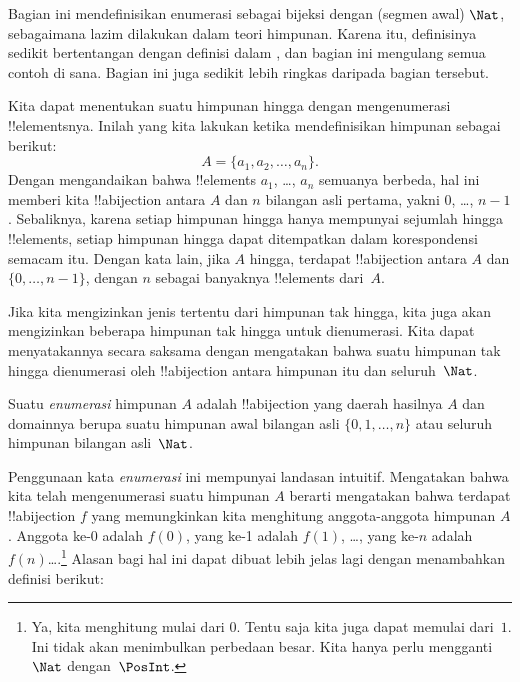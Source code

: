 \documentclass[../../../include/open-logic-section]{subfiles}
\begin{document}


\begin{editorial}
  Bagian ini mendefinisikan enumerasi sebagai bijeksi dengan (segmen awal)
  $\Nat$, sebagaimana lazim dilakukan dalam teori himpunan. Karena itu,
  definisinya sedikit bertentangan dengan definisi dalam , dan
  bagian ini mengulang semua contoh di sana. Bagian ini juga sedikit lebih
  ringkas daripada bagian tersebut.
\end{editorial}

Kita dapat menentukan suatu himpunan hingga dengan mengenumerasi
!!{element}snya. Inilah yang kita lakukan ketika mendefinisikan himpunan
sebagai berikut:
\[
  A = \{a_1, a_2, \ldots, a_n\}.
\]
Dengan mengandaikan bahwa !!{element}s $a_1$, \dots, $a_n$ semuanya berbeda,
hal ini memberi kita !!a{bijection} antara $A$ dan $n$ bilangan asli pertama,
yakni $0$, \dots, $n-1$. Sebaliknya, karena setiap himpunan hingga hanya
mempunyai sejumlah hingga !!{element}s, setiap himpunan hingga dapat
ditempatkan dalam korespondensi semacam itu. Dengan kata lain, jika $A$
hingga, terdapat !!a{bijection} antara $A$ dan $\{0, \dots, n-1\}$, dengan $n$
sebagai banyaknya !!{element}s dari~$A$.

Jika kita mengizinkan jenis tertentu dari himpunan tak hingga, kita juga akan
mengizinkan beberapa himpunan tak hingga untuk dienumerasi. Kita dapat
menyatakannya secara saksama dengan mengatakan bahwa suatu himpunan tak hingga
dienumerasi oleh !!a{bijection} antara himpunan itu dan seluruh~$\Nat$.

\begin{defn}
Suatu \emph{enumerasi} himpunan $A$ adalah !!a{bijection} yang daerah hasilnya
$A$ dan domainnya berupa suatu himpunan awal bilangan asli $\{0, 1, \ldots,
n\}$ {atau} seluruh himpunan bilangan asli~$\Nat$.
\end{defn}

\begin{explain}
Penggunaan kata \emph{enumerasi} ini mempunyai landasan intuitif. Mengatakan
bahwa kita telah mengenumerasi suatu himpunan $A$ berarti mengatakan bahwa
terdapat !!a{bijection} $f$ yang memungkinkan kita menghitung anggota-anggota
himpunan $A$. Anggota ke-$0$ adalah $f(0)$, yang ke-1 adalah $f(1)$, \ldots,
yang ke-$n$ adalah $f(n)$\ldots.\footnote{Ya, kita menghitung mulai dari $0$.
Tentu saja kita juga dapat memulai dari~$1$. Ini tidak akan menimbulkan
perbedaan besar. Kita hanya perlu mengganti~$\Nat$ dengan~$\PosInt$.} Alasan
bagi hal ini dapat dibuat lebih jelas lagi dengan menambahkan definisi
berikut:
\end{explain}
\end{document}
